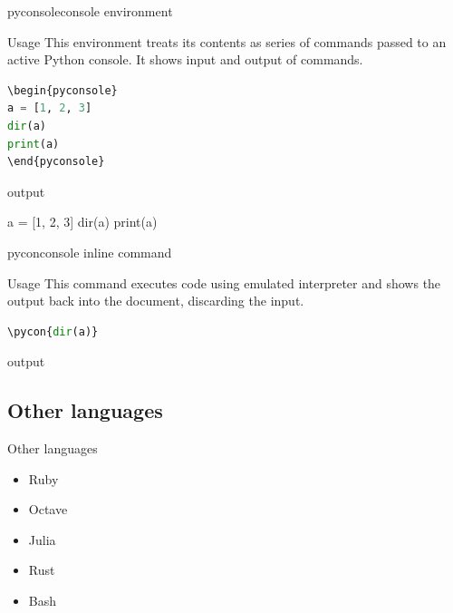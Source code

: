 \documentclass[
aspectratio=1610,
hyperref={pdfpagemode=FullScreen},
english,
usenames,
dvipsnames
]
{beamer} %
\begin{document}
   \begin{frame}[fragile]{pyconsole}{console environment}
  
  \begin{block}{Usage}
  	This environment treats its contents as series of commands passed to an active Python console. It shows input and output of commands.
  \end{block}
  
 \begin{lstlisting}[basicstyle=\tiny, language=python]
\begin{pyconsole}
a = [1, 2, 3] 
dir(a) 
print(a)
\end{pyconsole}
\end{lstlisting}
  
\begin{exampleblock}{output}
\begin{pyconsole}
a = [1, 2, 3]
dir(a)
print(a)
\end{pyconsole}
    \onslide
	\end{exampleblock}
  
  \end{frame}
  
  \begin{frame}[fragile]{pycon}{console inline command}
  
  \begin{block}{Usage}
  	This command executes code using emulated interpreter and shows the output back into the document, discarding the input.
  \end{block}
  
 \begin{lstlisting}[basicstyle=\tiny, language=python]
\pycon{dir(a)}
\end{lstlisting}
  
\begin{exampleblock}{output}
    \onslide
	\end{exampleblock}
  
  \end{frame}


\subsection{Other languages}
\begin{frame}[fragile]{Other languages}
  \begin{itemize}[<+->]
  \item Ruby
  \item Octave
  \item Julia
  \item Rust
  \item Bash
  \end{itemize}
\end{frame}
\end{document}
